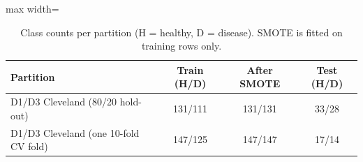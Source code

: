 \begin{table}[!t]
\centering
\scriptsize
\caption{Class counts per partition (H = healthy, D = disease). SMOTE is fitted on training rows only.}
\label{tab:counts}
\setlength{\tabcolsep}{3pt}
\begin{adjustbox}{max width=\linewidth}
\begin{tabular}{lccc}
\toprule
Partition & Train (H/D) & After SMOTE & Test (H/D) \\
\midrule
D1/D3 Cleveland (80/20 hold-out) & 131/111 & 131/131 & 33/28 \\
D1/D3 Cleveland (one 10-fold CV fold) & 147/125 & 147/147 & 17/14 \\
\bottomrule
\end{tabular}
\end{adjustbox}
\end{table}
